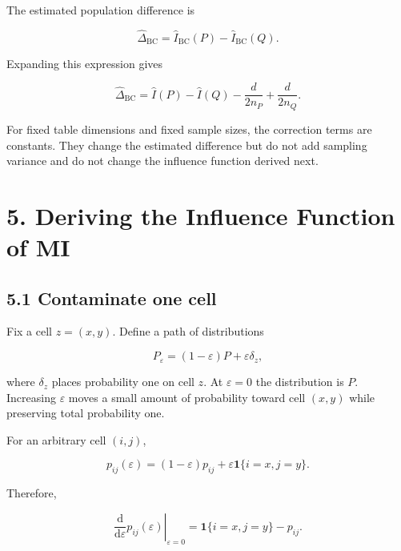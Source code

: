 \documentclass[
  11pt]{article}
\let\originalsection\section
\renewcommand{\section}{\clearpage\originalsection}
\begin{document}
The estimated population difference is

\begin{equation}
\widehat\Delta_{\mathrm{BC}}
=\widehat I_{\mathrm{BC}}(P)
-\widehat I_{\mathrm{BC}}(Q).
\end{equation}

Expanding this expression gives

\begin{equation}
\widehat\Delta_{\mathrm{BC}}
=\widehat I(P)-\widehat I(Q)
-\frac{d}{2n_P}+\frac{d}{2n_Q}.
\end{equation}

For fixed table dimensions and fixed sample sizes, the correction terms
are constants. They change the estimated difference but do not add
sampling variance and do not change the influence function derived next.

\section{5. Deriving the Influence Function of
MI}\label{deriving-the-influence-function-of-mi}

\subsection{5.1 Contaminate one cell}\label{contaminate-one-cell}

Fix a cell \(z=(x,y)\). Define a path of distributions

\begin{equation}
P_\varepsilon
=(1-\varepsilon)P+\varepsilon\delta_z,
\end{equation}

where \(\delta_z\) places probability one on cell \(z\). At
\(\varepsilon=0\) the distribution is \(P\). Increasing \(\varepsilon\)
moves a small amount of probability toward cell \((x,y)\) while
preserving total probability one.

For an arbitrary cell \((i,j)\),

\begin{equation}
p_{ij}(\varepsilon)
=(1-\varepsilon)p_{ij}
+\varepsilon\mathbf 1\{i=x,j=y\}.
\end{equation}

Therefore,

\begin{equation}
\left.
\frac{\mathrm d}{\mathrm d\varepsilon}p_{ij}(\varepsilon)
\right|_{\varepsilon=0}
=\mathbf 1\{i=x,j=y\}-p_{ij}.
\end{equation}
\end{document}
